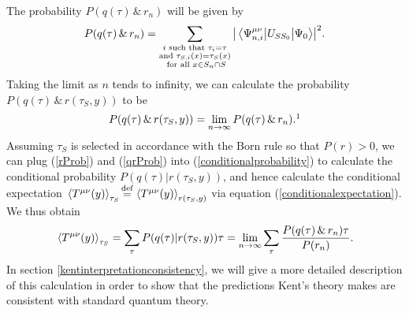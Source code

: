 The probability $P(q(\tau) \, \&\,  r_n)$ will be given by
\begin{equation}\label{qrnProb}P(q(\tau) \, \&\,  r_n) =\sum_{\substack{i \text{ such that } \tau_{i}=\tau \\ \text{and }\tau_{S,i}(x)=\tau_S(x)\\ \text{ for all }x\in S_n\cap S }}\abs{\mel{\Psi_{n,i}^{\mu\nu}}{U_{SS_0}}{\Psi_0}}^2.
\end{equation}
Taking the limit as $n$ tends to infinity, we can calculate the probability $P(q(\tau) \, \&\,  r(\tau_S,y))$ to be
\begin{equation}\label{qrProb}
P(q(\tau) \, \&\,  r(\tau_S,y))=\lim_{n\rightarrow\infty}P(q(\tau) \, \&\,  r_n).\protect\footnotemark
\end{equation}Assuming $\tau_S$ is selected in accordance with the Born rule so that $P(r)>0$, we can plug (\ref{rProb}) and (\ref{qrProb}) into (\ref{conditionalprobability}) to calculate the conditional probability $P(q(\tau) | r(\tau_S,y))$,  and hence calculate the conditional expectation  $\ev*{T^{\mu\nu}(y)}_{\tau_S}\myeq \ev*{T^{\mu\nu}(y)}_{r(\tau_S,y)}$ via equation (\ref{conditionalexpectation}). We thus obtain
\begin{equation}\label{beable1}
  \ev*{T^{\mu\nu}(y)}_{\tau_S}=\sum_\tau P(q(\tau) | r(\tau_S,y))\tau=\lim_{n\rightarrow\infty}\sum_\tau\frac{P(q(\tau) \, \& \, r_n)\tau}{P(r_n)}.
  \end{equation} 
In section \ref{kentinterpretationconsistency}, we will give a more detailed description of this calculation in order to show that the predictions Kent's theory makes are consistent with standard quantum theory.
 
